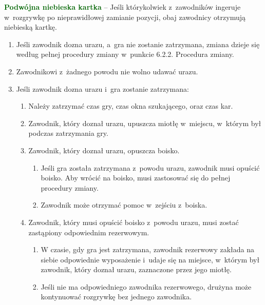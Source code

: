 \documentclass[12pt,a4paper]{article}
\renewcommand{\subsubsection}[1]{
  \oldsubsubsection{#1}%
  \leftskip1.5cm
}
\newcommand\other[1]{\bgroup\textcolor{darkgreen}{\textbf{#1}}}
\begin{document}
\other{Podwójna niebieska kartka} -- Jeśli którykolwiek z~zawodników
ingeruje w~rozgrywkę po nieprawidłowej zamianie pozycji, obaj zawodnicy
otrzymują niebieską kartkę.

\subsubsection{Zmiany z~powodu urazu}

\begin{enumerate}
	\item
	      Jeśli zawodnik dozna urazu, a~gra nie zostanie zatrzymana, zmiana
	      dzieje się według pełnej procedury zmiany w~punkcie 6.2.2. Procedura
	      zmiany.
	\item
	      Zawodnikowi z~żadnego powodu nie wolno udawać urazu.
	\item
	      Jeśli zawodnik dozna urazu i~gra zostanie zatrzymana:

	      \begin{enumerate}
		      \item
		            Należy zatrzymać czas gry, czas okna szukającego, oraz czas kar.
		      \item
		            Zawodnik, który doznał urazu, upuszcza miotłę w~miejscu, w~którym
		            był podczas zatrzymania gry.
		      \item
		            Zawodnik, który doznał urazu, opuszcza boisko.

		            \begin{enumerate}
			            \item
			                  Jeśli gra została zatrzymana z~powodu urazu, zawodnik musi opuścić
			                  boisko. Aby wrócić na boisko, musi zastosować się do pełnej
			                  procedury zmiany.
			            \item
			                  Zawodnik może otrzymać pomoc w~zejściu z~boiska.
		            \end{enumerate}
		      \item
		            Zawodnik, który musi opuścić boisko z~powodu urazu, musi zostać
		            zastąpiony odpowiednim rezerwowym.

		            \begin{enumerate}
			            \item
			                  W czasie, gdy gra jest zatrzymana, zawodnik rezerwowy zakłada na
			                  siebie odpowiednie wyposażenie i~udaje się na miejsce, w~którym
			                  był zawodnik, który doznał urazu, zaznaczone przez jego miotłę.
			            \item
			                  Jeśli nie ma odpowiedniego zawodnika rezerwowego, drużyna może
			                  kontynuować rozgrywkę bez jednego zawodnika.
		            \end{enumerate}
	      \end{enumerate}
\end{enumerate}
\end{document}
